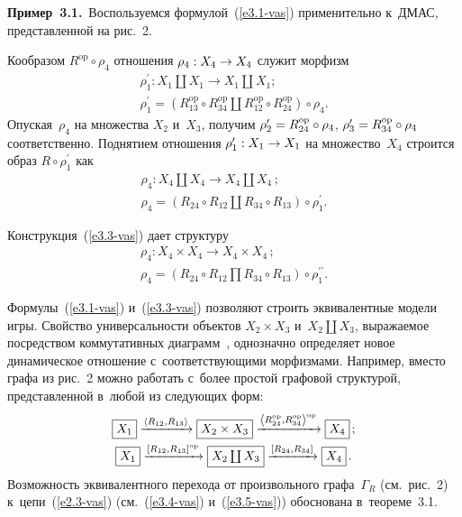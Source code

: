 \begin{multicols}{2}
    \smallskip
    
    \noindent
    \textbf{Пример~3.1.}\ Воспользуемся формулой~(\ref{e3.1-vas}) 
применительно к~ДМАС, пред\-став\-лен\-ной на рис.~2. 
    
     


     
    
     
Кообразом $R^{\mathrm{op}}\circ \rho_4$ отношения $\rho_4: X_4\hm\to X_4$ служит морфизм 
\begin{multline*}
\rho_1^\prime: X_1\coprod X_1 \to X_1\coprod X_1;
\\
\rho_1^\prime =\left( R_{13}^{\mathrm{op}} \circ R_{34}^{\mathrm{op}}\coprod R_{12}^{\mathrm{op}} \circ 
R_{24}^{\mathrm{op}}\right)\circ \rho_4.
\end{multline*}
Опуская~$\rho_4$ на множества $X_2$ и~$X_3$, получим $\rho_2^\prime \hm= 
R_{24}^{\mathrm{op}} \circ \rho_4$, $\rho_3^\prime\hm= R_{34}^{\mathrm{op}} \circ \rho_4$ 
соответственно. Поднятием отношения $\rho_1^\prime: X_1\hm\to X_1$ на 
множество~$X_4$ строится образ  $R\circ \rho_1^\prime$ как
\begin{multline*}
\rho_4: X_4\coprod X_4 \to X_4\coprod X_4\,;\\
 \rho_4=\left( R_{24}\circ R_{12} \coprod 
R_{34} \circ R_{13}\right) \circ \rho_1^\prime.
\end{multline*}
    
    Конструкция~(\ref{e3.3-vas}) дает структуру
\begin{multline*}
    \rho_4: X_4\times X_4 \to X_4\times X_4\,;\\
     \rho_4=\left( R_{24}\circ R_{12} \prod 
R_{34} \circ R_{13}\right) \circ \rho_1^{\prime\prime}.
\end{multline*}
    
    Формулы~(\ref{e3.1-vas}) и~(\ref{e3.3-vas}) позволяют строить эквивалентные 
модели игры. Свойство универсальности объектов $X_2\times X_3$ и~$X_2\coprod 
X_3$, вы\-ра\-жа\-емое по\-средст\-вом коммутативных диаграмм~\cite{11-vas}, однозначно 
определяет новое динамическое отношение с~со\-от\-вет\-ст\-ву\-ющи\-ми морфизмами. 
Например, вместо графа из рис.~2 мож\-но работать с~более прос\-той 
графовой структурой, пред\-став\-лен\-ной в~любой из сле\-ду\-ющих форм:
    \begin{gather}
    \mbox{\fbox{$X_1$}} \xrightarrow{\left\langle R_{12}, R_{13}\right\rangle} 
\mbox{\fbox{$X_2\times X_3$}} \xrightarrow{\left\langle R_{24}^{\mathrm{op}}, 
R_{34}^{\mathrm{op}}\right\rangle^{\mathrm{op}}} \mbox{\fbox{$X_4$}}\,;
    \label{e3.4-vas}\\
    \mbox{\fbox{$X_1$}} \xrightarrow{[ R_{12}, R_{13}]^{\mathrm{op}}} 
\mbox{\fbox{$X_2\coprod X_3$}} \xrightarrow{[ R_{24}, R_{34}]} 
\mbox{\fbox{$X_4$}}\,.
    \label{e3.5-vas}
    \end{gather}
Возможность эквивалентного перехода от произвольного графа~$\Gamma_R$ (см.\ 
рис.~2) к~цепи~(\ref{e2.3-vas}) (см.\ (\ref{e3.4-vas}) и~(\ref{e3.5-vas})) 
обоснована в~тео\-ре\-ме~3.1. 
    

\end{multicols}
